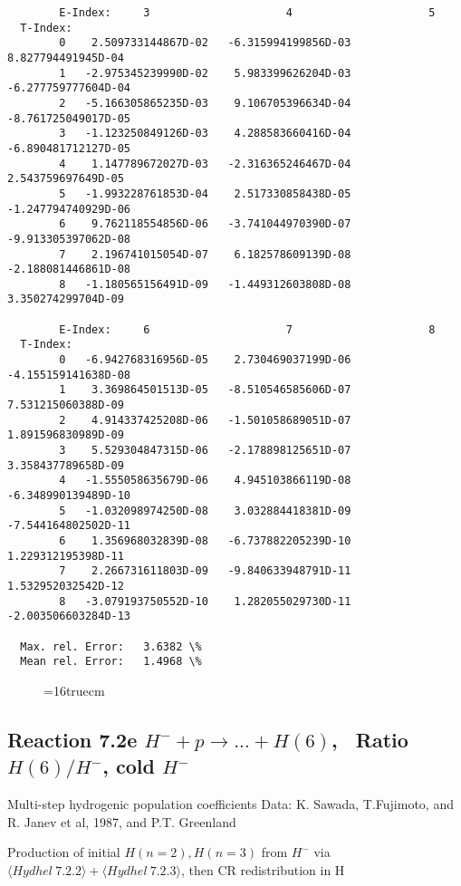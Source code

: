 \documentclass[12pt,dvipdfmx]{article}
\begin{document}
{\begin{small}
\begin{verbatim}
        E-Index:     3                     4                     5
  T-Index:
        0    2.509733144867D-02   -6.315994199856D-03    8.827794491945D-04
        1   -2.975345239990D-02    5.983399626204D-03   -6.277759777604D-04
        2   -5.166305865235D-03    9.106705396634D-04   -8.761725049017D-05
        3   -1.123250849126D-03    4.288583660416D-04   -6.890481712127D-05
        4    1.147789672027D-03   -2.316365246467D-04    2.543759697649D-05
        5   -1.993228761853D-04    2.517330858438D-05   -1.247794740929D-06
        6    9.762118554856D-06   -3.741044970390D-07   -9.913305397062D-08
        7    2.196741015054D-07    6.182578609139D-08   -2.188081446861D-08
        8   -1.180565156491D-09   -1.449312603808D-08    3.350274299704D-09

        E-Index:     6                     7                     8
  T-Index:
        0   -6.942768316956D-05    2.730469037199D-06   -4.155159141638D-08
        1    3.369864501513D-05   -8.510546585606D-07    7.531215060388D-09
        2    4.914337425208D-06   -1.501058689051D-07    1.891596830989D-09
        3    5.529304847315D-06   -2.178898125651D-07    3.358437789658D-09
        4   -1.555058635679D-06    4.945103866119D-08   -6.348990139489D-10
        5   -1.032098974250D-08    3.032884418381D-09   -7.544164802502D-11
        6    1.356968032839D-08   -6.737882205239D-10    1.229312195398D-11
        7    2.266731611803D-09   -9.840633948791D-11    1.532952032542D-12
        8   -3.079193750552D-10    1.282055029730D-11   -2.003506603284D-13

  Max. rel. Error:   3.6382 \%
  Mean rel. Error:   1.4968 \%

\end{verbatim}\end{small}
\begin{figure} \label{7.2d}
\epsfxsize=16truecm
\end{figure}
\newpage

\subsection{
Reaction 7.2e $ H^- + p \rightarrow ...+ H(6) $, \   Ratio $H(6)/H^- $, cold $H^-$
}
 Multi-step hydrogenic population coefficients
 Data: K. Sawada, T.Fujimoto, \cite{kn:Sawada} and R. Janev et al, 1987, and P.T. Greenland

Production of initial $H(n=2), H(n=3)$ from $H^-$ via $ \langle Hydhel~ 7.2.2\rangle + \langle Hydhel~ 7.2.3\rangle$,
 then CR redistribution in H

}
\end{document}
